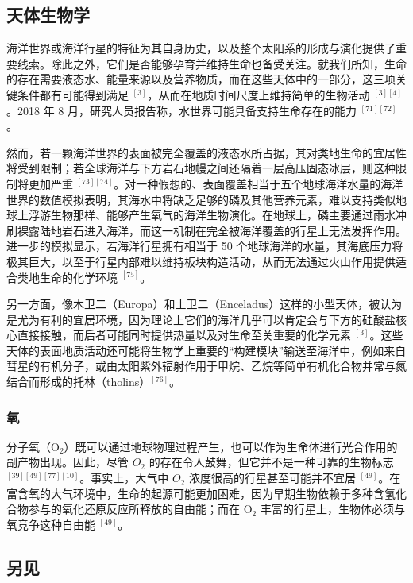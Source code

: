 \subsection{天体生物学}
海洋世界或海洋行星的特征为其自身历史，以及整个太阳系的形成与演化提供了重要线索。除此之外，它们是否能够孕育并维持生命也备受关注。就我们所知，生命的存在需要液态水、能量来源以及营养物质，而在这些天体中的一部分，这三项关键条件都有可能得到满足 $^{[3]}$，从而在地质时间尺度上维持简单的生物活动 $^{[3][4]}$。2018 年 8 月，研究人员报告称，水世界可能具备支持生命存在的能力 $^{[71][72]}$。

然而，若一颗海洋世界的表面被完全覆盖的液态水所占据，其对类地生命的宜居性将受到限制；若全球海洋与下方岩石地幔之间还隔着一层高压固态冰层，则这种限制将更加严重 $^{[73][74]}$。对一种假想的、表面覆盖相当于五个地球海洋水量的海洋世界的数值模拟表明，其海水中将缺乏足够的磷及其他营养元素，难以支持类似地球上浮游生物那样、能够产生氧气的海洋生物演化。在地球上，磷主要通过雨水冲刷裸露陆地岩石进入海洋，而这一机制在完全被海洋覆盖的行星上无法发挥作用。进一步的模拟显示，若海洋行星拥有相当于 50 个地球海洋的水量，其海底压力将极其巨大，以至于行星内部难以维持板块构造活动，从而无法通过火山作用提供适合类地生命的化学环境 $^{[75]}$。

另一方面，像木卫二（Europa）和土卫二（Enceladus）这样的小型天体，被认为是尤为有利的宜居环境，因为理论上它们的海洋几乎可以肯定会与下方的硅酸盐核心直接接触，而后者可能同时提供热量以及对生命至关重要的化学元素 $^{[3]}$。这些天体的表面地质活动还可能将生物学上重要的“构建模块”输送至海洋中，例如来自彗星的有机分子，或由太阳紫外辐射作用于甲烷、乙烷等简单有机化合物并常与氮结合而形成的托林（tholins）$^{[76]}$。
\subsubsection{氧}
分子氧（O$_2$）既可以通过地球物理过程产生，也可以作为生命体进行光合作用的副产物出现。因此，尽管 $O_2$ 的存在令人鼓舞，但它并不是一种可靠的生物标志 $^{[39][49][77][10]}$。事实上，大气中 $O_2$ 浓度很高的行星甚至可能并不宜居 $^{[49]}$。在富含氧的大气环境中，生命的起源可能更加困难，因为早期生物依赖于多种含氢化合物参与的氧化还原反应所释放的自由能；而在 O$_2$ 丰富的行星上，生物体必须与氧竞争这种自由能 $^{[49]}$。
\subsection{另见}

